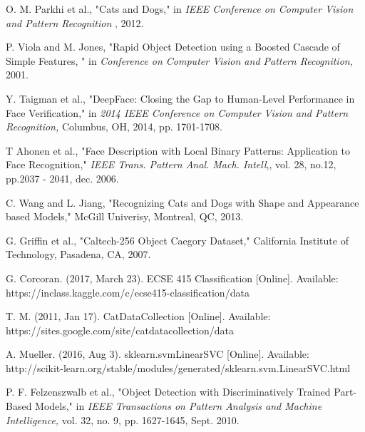 \documentclass[conference,compsoc]{IEEEtran}
\begin{document}
\begin{thebibliography}{9}

	O. M. Parkhi et al.,
	"Cats and Dogs," in 
	\emph{IEEE Conference on Computer Vision and Pattern Recognition} , 2012.

	P. Viola and M. Jones,
	"Rapid Object Detection using a Boosted Cascade of Simple Features, " in
	\emph{Conference on Computer Vision and Pattern Recognition}, 2001.
		
	Y. Taigman et al.,
	"DeepFace: Closing the Gap to Human-Level Performance in Face Verification," in
	\emph{2014 IEEE Conference on Computer Vision and Pattern Recognition,}  Columbus, OH, 2014, pp. 1701-1708.

  T Ahonen et al.,
  "Face Description with Local Binary Patterns: Application to Face Recognition,"
  \emph{IEEE Trans. Pattern Anal. Mach. Intell},, vol. 28, no.12, pp.2037 - 2041, dec. 2006.
  
  
	C. Wang and L. Jiang,
	"Recognizing Cats and Dogs with Shape and Appearance based Models," McGill Univerisy, Montreal, QC, 2013.

	G. Griffin et al.,
	"Caltech-256 Object Caegory Dataset," California Institute of Technology, Pasadena, CA, 2007.

	G. Corcoran. (2017, March 23). ECSE 415 Classification [Online]. Available: https://inclass.kaggle.com/c/ecse415-classification/data

	T. M. (2011, Jan 17). CatDataCollection [Online]. Available: https://sites.google.com/site/catdatacollection/data
	
	A. Mueller. (2016, Aug 3). sklearn.svmLinearSVC [Online]. Available: http://scikit-learn.org/stable/modules/generated/sklearn.svm.LinearSVC.html

%
	P. F. Felzenszwalb et al., 
	"Object Detection with Discriminatively Trained Part-Based Models," in
	\emph{IEEE Transactions on Pattern Analysis and Machine Intelligence,} vol. 32, no. 9, pp. 1627-1645, Sept. 2010.
	 

\end{thebibliography}
\end{document}
